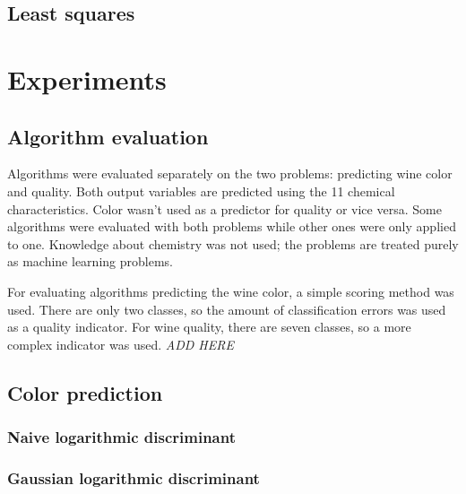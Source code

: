 \documentclass[twoside]{article}
\begin{document}
\begin{multicols}{2}
\subsection{Least squares}



\section{Experiments}

\subsection{Algorithm evaluation}

Algorithms were evaluated separately on the two problems: predicting wine color and quality.
Both output variables are predicted using the 11 chemical characteristics. Color wasn't used
as a predictor for quality or vice versa.
Some algorithms were evaluated with both problems while other ones were only applied to one.
Knowledge about chemistry was not used; the problems are treated purely as machine learning
problems.

For evaluating algorithms predicting the wine color, a simple scoring method was used.
There are only two classes, so the amount of classification errors was used as a quality indicator.
For wine quality, there are seven classes, so a more complex indicator was used. \emph{ADD HERE}

\subsection{Color prediction}

\subsubsection{Naive logarithmic discriminant}

\subsubsection{Gaussian logarithmic discriminant}


\end{multicols}
\end{document}
